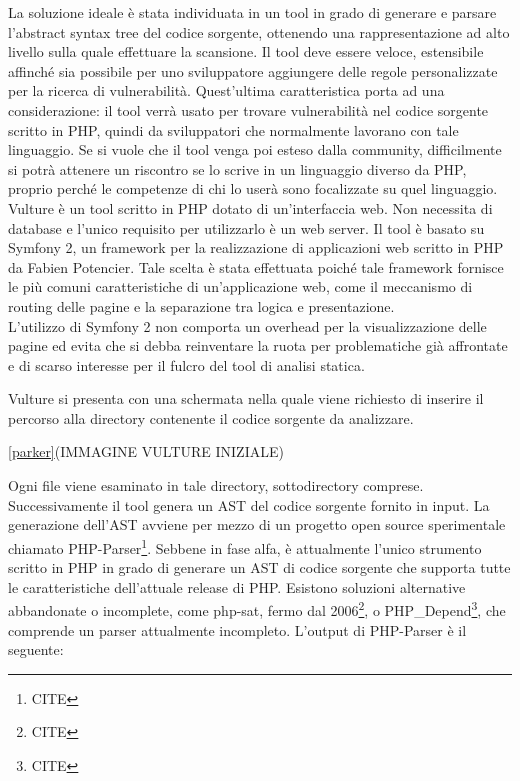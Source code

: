 La soluzione ideale è stata individuata in un tool in grado di generare e parsare l'abstract syntax tree del codice sorgente, ottenendo una rappresentazione ad alto livello sulla quale effettuare la scansione. Il tool deve essere veloce, estensibile affinché sia possibile per uno sviluppatore aggiungere delle regole personalizzate per la ricerca di vulnerabilità. Quest'ultima caratteristica porta ad una considerazione: il tool verrà usato per trovare vulnerabilità nel codice sorgente scritto in PHP, quindi da sviluppatori che normalmente lavorano con tale linguaggio. Se si vuole che il tool venga poi esteso dalla community, difficilmente si potrà attenere un riscontro se lo scrive in un linguaggio diverso da PHP, proprio perché le competenze di chi lo userà sono focalizzate su quel linguaggio.\\

Vulture è un tool scritto in PHP dotato di un'interfaccia web. Non necessita di database e l'unico requisito per utilizzarlo è un web server. Il tool è basato su Symfony 2, un framework per la realizzazione di applicazioni web scritto in PHP da Fabien Potencier. Tale scelta è stata effettuata poiché tale framework fornisce le più comuni caratteristiche di un'applicazione web, come il meccanismo di routing delle pagine e la separazione tra logica e presentazione.\\
L'utilizzo di Symfony 2 non comporta un overhead per la visualizzazione delle pagine ed evita che si debba reinventare la ruota per problematiche già affrontate e di scarso interesse per il fulcro del tool di analisi statica.

Vulture si presenta con una schermata nella quale viene richiesto di inserire il percorso alla directory contenente il codice sorgente da analizzare. 

\ref{parker}(IMMAGINE VULTURE INIZIALE)

Ogni file viene esaminato in tale directory, sottodirectory comprese.\\
Successivamente il tool genera un AST del codice sorgente fornito in input. La generazione dell'AST avviene per mezzo di un progetto open source sperimentale chiamato PHP-Parser\footnote{CITE}. Sebbene in fase alfa, è attualmente l'unico strumento scritto in PHP in grado di generare un AST di codice sorgente che supporta tutte le caratteristiche dell'attuale release di PHP. Esistono soluzioni alternative abbandonate o incomplete, come php-sat, fermo dal 2006\footnote{CITE}, o PHP\_Depend\footnote{CITE}, che comprende un parser attualmente incompleto.
L'output di PHP-Parser è il seguente:

